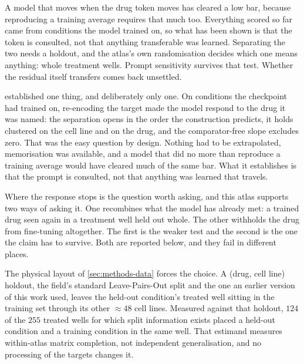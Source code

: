 \label{sec:methods-holdout}

\begin{question}[6]
A model that moves when the drug token moves has cleared a low bar, because
reproducing a training average requires that much too. Everything scored so far
came from conditions the model trained on, so what has been shown is that the
token is consulted, not that anything transferable was learned. Separating the
two needs a holdout, and the
atlas's own randomisation decides which one means anything: whole treatment
wells. Prompt sensitivity survives that test. Whether the residual itself
transfers comes back unsettled.
\end{question}

\noindent

 established one thing, and deliberately only one. On
conditions the checkpoint had trained on, re-encoding the target made the model
respond to the drug it was named: the separation opens in the order the
construction predicts, it holds clustered on the cell line and on the drug, and
the comparator-free slope excludes zero. That was the easy question by design.
Nothing had to be extrapolated, memorisation was available, and a model that did
no more than reproduce a training average would have cleared much of the same bar.
What it establishes is that the prompt is consulted, not that anything was learned
that travels.

Where the response stops is the question worth asking, and this atlas supports two
ways of asking it. One recombines what the model has already met: a trained drug
seen again in a treatment well held out whole. The other withholds the drug from
fine-tuning altogether. The first is the weaker test and the second is the one the
claim has to survive. Both are reported below, and they fail in different places.

The physical layout of \cref{sec:methods-data} forces the choice. A (drug, cell
line) holdout, the field's standard Leave-Pairs-Out split and the one an earlier
version of this work used, leaves the held-out condition's treated well sitting
in the training set through its other $\approx 48$ cell lines. Measured against
that holdout, $\num{124}$ of the $\num{255}$ treated wells for which split
information exists placed a held-out condition and a training condition in the
same well. That estimand measures within-atlas matrix completion, not independent
generalisation, and no processing of the targets changes it.

